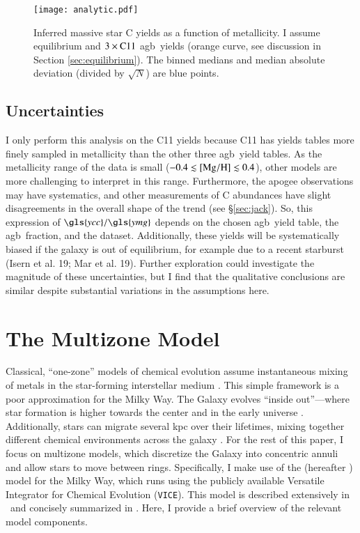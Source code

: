 \documentclass[12pt,oneside,letterpaper]{report}
\newcommand{\agb}{\gls{agb}}
\newcommand{\apogee}{\gls{apogee}}
\newcommand{\Ycc}{\gls{ycc}}
\newcommand{\Yoc}{\gls{ymg}}
\newcommand{\JJ}{\citetalias{james+21}}
\newcommand{\VICE}{\texttt{VICE}}
\begin{document}
\begin{figure}
    \centering
    \texttt{[image: analytic.pdf]}
    \caption[Reverse fit yields]{Inferred massive star C yields as a function of metallicity. I assume equilibrium and $3\times {\rm C11}$ \agb\ yields (orange curve, see discussion in Section \ref{sec:equilibrium}). The binned medians and median absolute deviation (divided by $\sqrt{N}$) are blue points.
    }
    \label{fig:analytic}
\end{figure}





\section{Uncertainties}

I only perform this analysis on the C11 yields because C11 has yields tables more finely sampled in metallicity than the other three \agb\ yield tables. As the metallicity range of the data is small ($-0.4\lesssim {\rm [Mg/H]} \lesssim 0.4$), other models are more challenging to interpret in this range. Furthermore, the \apogee{} observations may have systematics, and other measurements of C abundances \citep[e.g.][]{vincenzo+21} have slight disagreements in the overall shape of the trend (see \S\ref{sec:jack}).
So, this expression of $\Ycc/\Yoc$ depends on the chosen \agb\ yield table, the \agb\ fraction, and the dataset. 
Additionally, these yields will be systematically biased if the galaxy is out of equilibrium, for example due to a recent starburst (Isern et al. 19; Mar et al. 19). Further exploration could investigate the magnitude of these uncertainties, but I find that the qualitative conclusions are similar despite substantial variations in the assumptions here.



\chapter{The Multizone Model}\label{sec:vice}

Classical, ``one-zone'' models of chemical evolution assume instantaneous mixing of metals in the star-forming interstellar medium \citep[e.g.][]{matteucci21}. This simple framework is a poor approximation for the Milky Way.  The Galaxy evolves ``inside out''---where star formation is higher towards the center and in the early universe \citep{bird+13}. Additionally, stars can migrate several kpc over their lifetimes, mixing together different chemical environments across the galaxy \citep{bird+12,sellwood+binney02}. For the rest of this paper, I focus on multizone models, which discretize the Galaxy into concentric annuli and allow stars to move between rings.  Specifically, I make use of the \citet{james+21} (hereafter \JJ) model for the Milky Way, which runs using the publicly available Versatile Integrator for Chemical Evolution (\VICE). This model is described extensively in \JJ~and concisely summarized  in \citet{james+23}. Here, I provide a brief overview of the relevant model components.
\end{document}
